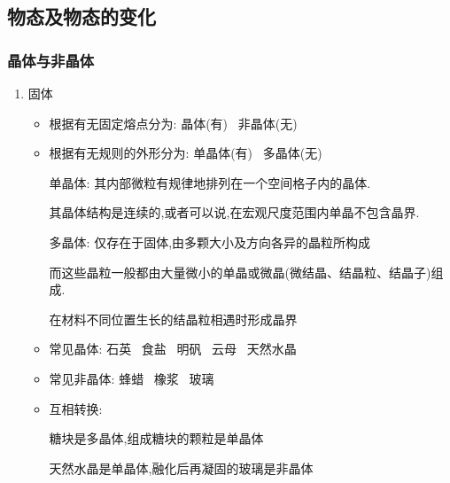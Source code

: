 \documentclass{article}
\begin{document}
\vspace{2em}

\subsection{物态及物态的变化}
\subsubsection{晶体与非晶体}
\begin{enumerate}
    \item 固体
          \begin{itemize}
              \item 根据有无固定熔点分为: 晶体(有) \, 非晶体(无)
              \item 根据有无规则的外形分为: 单晶体(有) \, 多晶体(无)

                    \vspace{-1em}
                    \begin{adjustbox}{minipage=0.91\linewidth, bgcolor=gray!20, padding=1em}
                        \small %
                        单晶体: 其内部微粒有规律地排列在一个空间格子内的晶体.

                        \hspace{3.8em}其晶体结构是连续的,或者可以说,在宏观尺度范围内单晶不包含晶界.

                        多晶体: 仅存在于固体,由多颗大小及方向各异的晶粒所构成

                        \hspace{3.8em}而这些晶粒一般都由大量微小的单晶或微晶(微结晶、结晶粒、结晶子)组成.

                        \hspace{3.8em}在材料不同位置生长的结晶粒相遇时形成晶界
                    \end{adjustbox}
                    \vspace{-1em}

              \item 常见晶体: 石英 \, 食盐 \, 明矾 \, 云母 \, 天然水晶
              \item 常见非晶体: 蜂蜡 \, 橡浆 \, 玻璃
              \item 互相转换:

                    \hspace{4.8em}糖块是多晶体,组成糖块的颗粒是单晶体

                    \hspace{4.8em}天然水晶是单晶体,融化后再凝固的玻璃是非晶体
          \end{itemize}


\end{enumerate}
\end{document}
